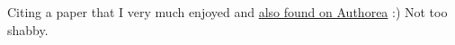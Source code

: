\cite{2014PLSCB..10E3542G} Citing a paper that I very much enjoyed and \href{https://www.authorea.com/users/3/articles/3410/_show_article}{also found on Authorea} :) Not too shabby.


    
    
    